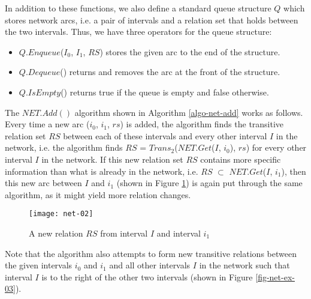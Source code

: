 \documentclass[11pt]{report}
\begin{document}
          In addition to these functions, we also define a standard queue
          structure $Q$ which stores network arcs, i.e. a pair of intervals
          and a relation set that holds between the two intervals. Thus, we
          have three operators for the queue structure:

          \begin{itemize}
            \item
              $Q.Enqueue$($I_0$, $I_1$, $RS$) stores the given arc to the end
              of the structure.
            \item
              $Q.Dequeue$() returns and removes the arc at the front of the
              structure.
            \item
              $Q.IsEmpty$() returns true if the queue is empty and false
              otherwise.
          \end{itemize}

          The $NET.Add()$ algorithm shown in Algorithm \ref{algo-net-add} works
          as follows. Every time a new arc ($i_0$, $i_1$, $rs$) is added, the
          algorithm finds the transitive relation set $RS$ between each of
          these intervals and every other interval $I$ in the network, i.e.
          the algorithm finds $RS$ = $Trans_2$($NET.Get$($I$, $i_0$), $rs$) for
          every other interval $I$ in the network. If this new relation set
          $RS$ contains more specific information than what is already in the
          network, i.e. $RS$ $\subset$ $NET.Get$($I$, $i_1$), then this new arc
          between $I$ and $i_1$ (shown in Figure \ref{fig-net-ex-02}) is again
          put through the same algorithm, as it might yield more relation
          changes.

          \begin{figure}[tbhp]
            \begin{center}
              \texttt{[image: net-02]}
              \caption{A new relation $RS$ from interval $I$ and interval $i_1$}
              \label{fig-net-ex-02}
            \end{center}
          \end{figure}

          Note that the algorithm also attempts to form new transitive
          relations between the given intervals $i_0$ and $i_1$ and all other
          intervals $I$ in the network such that interval $I$ is to the right
          of the other two intervals (shown in Figure \ref{fig-net-ex-03}).
\end{document}

